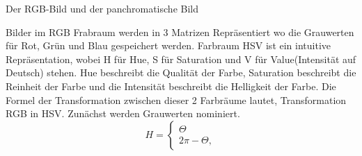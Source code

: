 \documentclass[12pt]{article}
\begin{document}
	\pagestyle{main}

Der RGB-Bild und der panchromatische Bild
\begin{figure}[ht]\centering
\end{figure}
\newline
Bilder im RGB Frabraum werden in 3 Matrizen Repräsentiert wo die Grauwerten für Rot, Grün und Blau gespeichert werden. Farbraum HSV ist ein intuitive Repräsentation, wobei H für Hue, S für Saturation und V für Value(Intensität auf Deutsch) stehen. Hue beschreibt die Qualität der Farbe, Saturation beschreibt die Reinheit der Farbe und die Intensität beschreibt die Helligkeit der Farbe. Die Formel der Transformation zwischen dieser 2 Farbräume lautet, \newline
\newline
Transformation RGB in HSV. Zunächst werden Grauwerten nominiert. 
\begin{equation*}
H = \begin{cases} \Theta \\ 2 \pi - \Theta,\end{cases}
\end{equation*}
\end{document}

